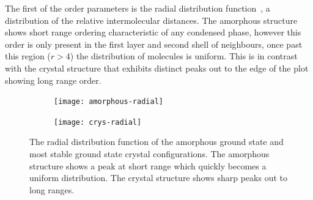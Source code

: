 The first of the order parameters is the radial distribution function~, a distribution of the relative intermolecular distances. The amorphous structure shows short range ordering characteristic of any condensed phase, however this order is only present in the first layer and second shell of neighbours, once past this region ($r>4$) the distribution of molecules is uniform. This is in contrast with the crystal structure that exhibits distinct peaks out to the edge of the plot showing long range order.

\begin{figure}
    \begin{subfigure}{0.5\textwidth}
        \texttt{[image: amorphous-radial]}
        \caption{}
        \label{fig:amorphous radial}
    \end{subfigure}
    \begin{subfigure}{0.5\textwidth}
        \texttt{[image: crys-radial]}
        \caption{}
        \label{fig:crys radial}
    \end{subfigure}
    \caption{The radial distribution function of the amorphous ground state  and most stable ground state crystal  configurations. The amorphous structure shows a peak at short range which quickly becomes a uniform distribution. The crystal structure shows sharp peaks out to long ranges.}
    \label{fig:radial comp}
\end{figure}

